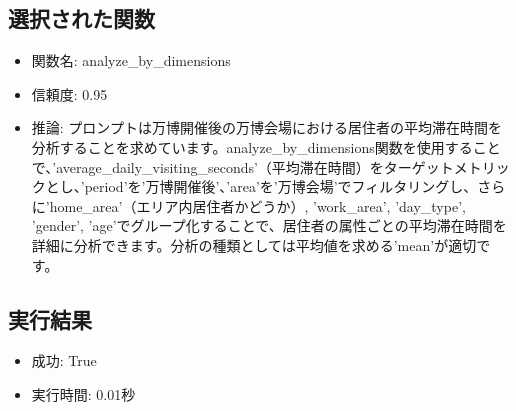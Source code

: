 \documentclass[11pt,a4paper]{article}
\begin{document}
\subsection{選択された関数}
\begin{itemize}
\item 関数名: analyze_by_dimensions
\item 信頼度: 0.95
\item 推論: プロンプトは万博開催後の万博会場における居住者の平均滞在時間を分析することを求めています。analyze_by_dimensions関数を使用することで、'average_daily_visiting_seconds'（平均滞在時間）をターゲットメトリックとし、'period'を'万博開催後'、'area'を'万博会場'でフィルタリングし、さらに'home_area'（エリア内居住者かどうか）, 'work_area', 'day_type', 'gender', 'age'でグループ化することで、居住者の属性ごとの平均滞在時間を詳細に分析できます。分析の種類としては平均値を求める'mean'が適切です。
\end{itemize}

\subsection{実行結果}
\begin{itemize}
\item 成功: True
\item 実行時間: 0.01秒
\end{itemize}
\end{document}
